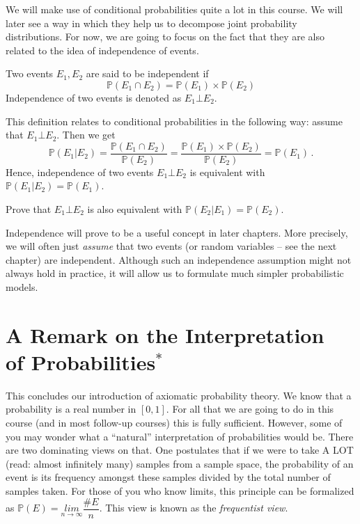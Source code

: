 We will make use of conditional probabilities quite a lot in this course. We will later see a way in which
they help us to decompose joint probability distributions. For now, we are going to focus on the fact that
they are also related to the idea of independence of events.

\begin{Definition}[Independence]
Two events $ E_{1}, E_{2} $ are said to be independent if 
$$ \mathbb{P}(E_{1} \cap E_{2}) = \mathbb{P}(E_{1}) \times \mathbb{P}(E_{2}) $$
Independence of two events is denoted as $ E_{1} \bot E_{2} $.
\end{Definition}

This definition relates to conditional probabilities in the following way: assume that $ E_{1} \bot E_{2} $.
Then we get
\begin{equation}
\mathbb{P}(E_{1}|E_{2}) = \dfrac{\mathbb{P}(E_{1} \cap E_{2})}{\mathbb{P}(E_{2})}
= \dfrac{\mathbb{P}(E_{1}) \times
  \mathbb{P}(E_{2})}{\mathbb{P}(E_{2})} = \mathbb{P}(E_{1}) \, .
\end{equation}
Hence, independence of two events $ E_{1} \bot E_{2}$ is equivalent with $\mathbb{P}(E_{1}|E_{2}) = \mathbb{P}(E_{1}) $.

\begin{Exercise}
 Prove that $E_1 \bot E_2$ is also equivalent with $\mathbb{P}(E_{2}|E_{1}) = \mathbb{P}(E_{2}) $. 
\end{Exercise}

Independence will prove to be a useful concept in later chapters. More precisely, we will often
just \textit{assume} that two events (or random variables -- see the next chapter) are independent. Although
such an independence assumption might not always hold in practice, it will allow us to formulate much simpler probabilistic models.


\section{A Remark on the Interpretation \\ of Probabilities$^{*}$}

This concludes our introduction of axiomatic probability theory. We know that a probability is
a real number in $ [0,1] $. For all that we are going to do in this course (and in most follow-up courses)
this is fully sufficient. However, some of you may wonder what a ``natural'' interpretation of probabilities
would be. There are two dominating views on that. One postulates that if we were to take A LOT (read: almost
infinitely many) samples from a sample space, the probability of an event is its frequency amongst these
samples divided by the total number of samples taken. For those of you who know limits, this principle can be
formalized as $ \mathbb{P}(E) = \underset{n \rightarrow \infty}{lim} \dfrac{\#E}{n} $. This view
is known as the \emph{frequentist view}.

